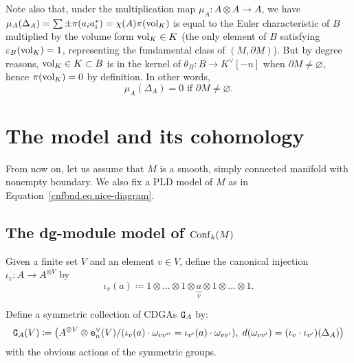 Note also that, under the multiplication map $\mu_{A} : A \otimes A \to A$, we have $\mu_{A}(\Delta_{A}) = \sum \pm \pi(a_{i}a_{i}^{*}) = \chi(A) \pi(\mathrm{vol}_{K})$ is equal to the Euler characteristic of $B$ multiplied by the volume form $\mathrm{vol}_{K} \in K$ (the only element of $B$ satisfying $\varepsilon_{B}(\mathrm{vol}_{K}) = 1$, representing the fundamental class of $(M, \partial M)$).
But by degree reasons, $\mathrm{vol}_{K} \in K \subset B$ is in the kernel of $\theta_{B} : B \to K^{\vee}[-n]$ when $\partial M \neq \varnothing$, hence $\pi(\mathrm{vol}_{K}) = 0$ by definition.
In other words,
\begin{equation}
  \label{cnfbnd.eq.mu-delta-zero}
  \mu_{A}(\Delta_{A}) = 0 \text{ if } \partial M \neq \varnothing.
\end{equation}

\section{The model and its cohomology}
\label{cnfbnd.sec.model-conf-spac}

From now on, let us assume that $M$ is a smooth, simply connected manifold with nonempty boundary.
We also fix a PLD model of $M$ as in Equation~\eqref{cnfbnd.eq.nice-diagram}.

\subsection{The dg-module model of \texorpdfstring{$\operatorname{Conf}_{k}(M)$}{Conf\_k(M)}}
\label{cnfbnd.sec.dgmodel}

Given a finite set $V$ and an element $v \in V$, define the canonical injection $\iota_{v} : A \to A^{\otimes V}$ by
\begin{equation}
  \iota_{v}(a) \coloneqq 1 \otimes \dots \otimes 1 \otimes \underbrace{a}_{v} \otimes 1 \otimes \dots \otimes 1.
\end{equation}

\begin{definition}
  \label{cnfbnd.def.ga}
  Define a symmetric collection of CDGAs $\mathtt{G}_{A}$ by:
  \begin{equation*}
    \mathtt{G}_{A}(V) \coloneqq \bigl( A^{\otimes V} \otimes \mathtt{e}_{n}^{\vee}(V) / (\iota_{v}(a) \cdot \omega_{vv''} = \iota_{v'}(a) \cdot \omega_{vv'}), \; d(\omega_{vv'}) = (\iota_{v} \cdot \iota_{v'})(\Delta_{A}) \bigr)
  \end{equation*}
  with the obvious actions of the symmetric groups.
\end{definition}

